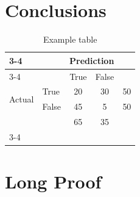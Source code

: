 \chapter{Conclusions}

\begin{table}
\centering
\caption{Example table}
\begin{tabular}{ll|c|c|c}
\cline{3-4}
                                              &       & \multicolumn{2}{c|}{Prediction} &                         \\ \cline{3-4}
                                              &       & True           & False          &                         \\ \hline
\multicolumn{1}{|c|}{\multirow{2}{*}{Actual}} & True  & 20             & 30             & \multicolumn{1}{l|}{50} \\ \cline{2-5} 
\multicolumn{1}{|c|}{}                        & False & 45             & 5              & \multicolumn{1}{l|}{50} \\ \hline
                                              &       & 65             & 35             &                         \\ \cline{3-4}
\end{tabular}
\end{table}

\lipsum[12-14]



\appendix 
\chapter{Long Proof}
\lipsum[15-24]
